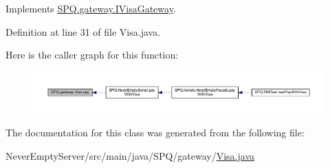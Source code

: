 Implements \mbox{\hyperlink{interface_s_p_q_1_1gateway_1_1_i_visa_gateway_adb8feee5084ca3e28c61360719a24c7a}{S\+P\+Q.\+gateway.\+I\+Visa\+Gateway}}.



Definition at line 31 of file Visa.\+java.

Here is the caller graph for this function\+:
\nopagebreak
\begin{figure}[H]
\begin{center}
\leavevmode
\includegraphics[width=350pt]{class_s_p_q_1_1gateway_1_1_visa_a0ecda0414a0685174ec12ae96c8d3a68_icgraph}
\end{center}
\end{figure}


The documentation for this class was generated from the following file\+:\begin{DoxyCompactItemize}
\item 
Never\+Empty\+Server/src/main/java/\+S\+P\+Q/gateway/\mbox{\hyperlink{_visa_8java}{Visa.\+java}}\end{DoxyCompactItemize}

